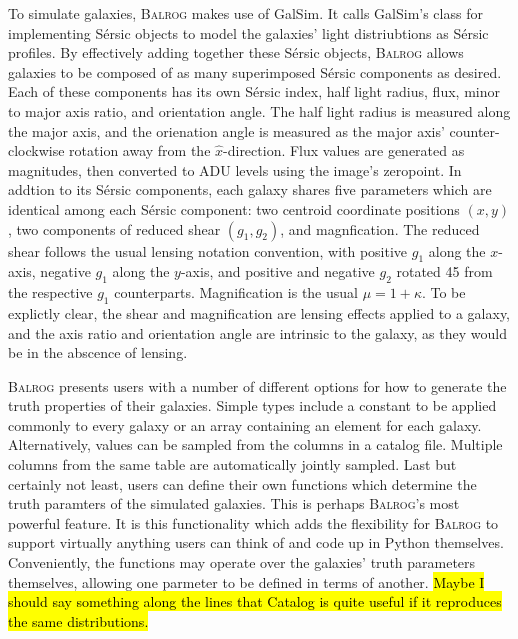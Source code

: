 \documentclass[12pt]{book}
\newcommand{\py}{Python}
\newcommand{\galsim}{GalSim}
\newcommand{\balrog}{\textsc{Balrog}}
\newcommand{\sersic}{S\'{e}rsic}
\begin{document}
To simulate galaxies, \balrog{} makes use of \galsim{}. 
It calls \galsim{}'s class for implementing \sersic{} objects to model the galaxies' light distriubtions as \sersic{} profiles. 
By effectively adding together these \sersic{} objects, \balrog{} allows galaxies to be composed of as many superimposed
\sersic{} components as desired. Each of these components has its own \sersic{} index, half light radius, flux,
minor to major axis ratio, and orientation angle. The half light radius is measured along
the major axis, and the orienation angle is measured as the major axis' counter-clockwise rotation
away from the $\hat{x}$-direction. 
Flux values are generated as magnitudes, then converted to ADU levels 
using the image's zeropoint.
In addtion to its \sersic{} components, each galaxy
shares five parameters which are identical among each \sersic{} component:
two centroid coordinate positions $(x, y)$, two components of reduced shear $(g_1, g_2)$, and magnfication.
The reduced shear follows the usual lensing notation convention, with positive $g_1$ along the $x$-axis,
negative $g_1$ along the $y$-axis, and positive and negative $g_2$ rotated 45\degree{} from the
respective $g_1$ counterparts. Magnification is the usual $\mu = 1 + \kappa$.
To be explictly clear, the shear and magnification are lensing effects applied to a galaxy,
and the axis ratio and orientation angle are intrinsic to the galaxy, as they would be in the abscence of lensing.

\balrog{} presents users with a number of different options for how to generate
the truth properties of their galaxies.
Simple types include a constant to be applied commonly to every galaxy or an array containing an element for each galaxy.
Alternatively, values can be sampled from the columns in a catalog file. 
Multiple columns from the same table are automatically jointly sampled.
Last but certainly not least, users can define their own functions which determine the truth paramters of the simulated galaxies.
This is perhaps \balrog{}'s most powerful feature.
It is this functionality which adds the flexibility for \balrog{} to support
virtually anything users can think of and code up in \py{} themselves.
Conveniently, the functions may operate over the galaxies' truth parameters themselves,
allowing one parmeter to be defined in terms of another.
\hl{Maybe I should say something along the lines that Catalog is quite useful if it reproduces the same distributions.}
\end{document}
